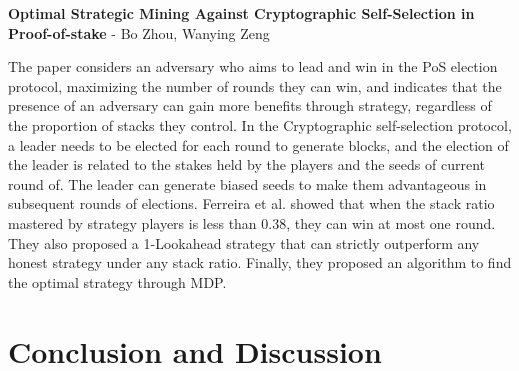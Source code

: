\textbf{Optimal Strategic Mining Against Cryptographic Self-Selection in Proof-of-stake} - Bo Zhou, Wanying Zeng

The paper \cite{ferreira2022optimal} considers an adversary who aims to lead and win in the PoS election protocol, maximizing the number of rounds they can win, and indicates that the presence of an adversary can gain more benefits through strategy, regardless of the proportion of stacks they control. In the Cryptographic self-selection protocol, a leader needs to be elected for each round to generate blocks, and the election of the leader is related to the stakes held by the players and the seeds of current round of. The leader can generate biased seeds to make them advantageous in subsequent rounds of elections. Ferreira et al. showed that when the stack ratio mastered by strategy players is less than 0.38, they can win at most one round. They also proposed a 1-Lookahead strategy that can strictly outperform any honest strategy under any stack ratio. Finally, they proposed an algorithm to find the optimal strategy through MDP.

\section{Conclusion and Discussion}

